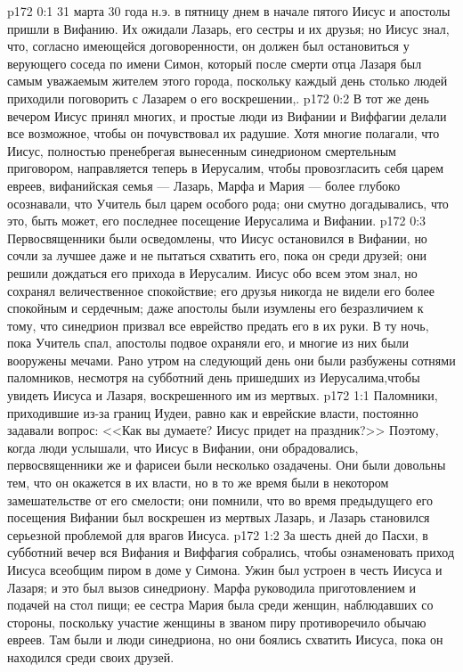 \vs p172 0:1 31 марта 30 года н.э. в пятницу днем в начале пятого Иисус и апостолы пришли в Вифанию. Их ожидали Лазарь, его сестры и их друзья; но Иисус знал, что, согласно имеющейся договоренности, он должен был остановиться у верующего соседа по имени Симон, который после смерти отца Лазаря был самым уважаемым жителем этого города, поскольку каждый день столько людей приходили поговорить с Лазарем о его воскрешении,.
\vs p172 0:2 В тот же день вечером Иисус принял многих, и простые люди из Вифании и Виффагии делали все возможное, чтобы он почувствовал их радушие. Хотя многие полагали, что Иисус, полностью пренебрегая вынесенным синедрионом смертельным приговором, направляется теперь в Иерусалим, чтобы провозгласить себя царем евреев, вифанийская семья --- Лазарь, Марфа и Мария --- более глубоко осознавали, что Учитель был царем особого рода; они смутно догадывались, что это, быть может, его последнее посещение Иерусалима и Вифании.
\vs p172 0:3 Первосвященники были осведомлены, что Иисус остановился в Вифании, но сочли за лучшее даже и не пытаться схватить его, пока он среди друзей; они решили дождаться его прихода в Иерусалим. Иисус обо всем этом знал, но сохранял величественное спокойствие; его друзья никогда не видели его более спокойным и сердечным; даже апостолы были изумлены его безразличием к тому, что синедрион призвал все еврейство предать его в их руки. В ту ночь, пока Учитель спал, апостолы подвое охраняли его, и многие из них были вооружены мечами. Рано утром на следующий день они были разбужены сотнями паломников, несмотря на субботний день пришедших из Иерусалима,чтобы увидеть Иисуса и Лазаря, воскрешенного им из мертвых.
\vs p172 1:1 Паломники, приходившие из\hyp{}за границ Иудеи, равно как и еврейские власти, постоянно задавали вопрос: <<Как вы думаете? Иисус придет на праздник?>> Поэтому, когда люди услышали, что Иисус в Вифании, они обрадовались, первосвященники же и фарисеи были несколько озадачены. Они были довольны тем, что он окажется в их власти, но в то же время были в некотором замешательстве от его смелости; они помнили, что во время предыдущего его посещения Вифании был воскрешен из мертвых Лазарь, и Лазарь становился серьезной проблемой для врагов Иисуса.
\vs p172 1:2 За шесть дней до Пасхи, в субботний вечер вся Вифания и Виффагия собрались, чтобы ознаменовать приход Иисуса всеобщим пиром в доме у Симона. Ужин был устроен в честь Иисуса и Лазаря; и это был вызов синедриону. Марфа руководила приготовлением и подачей на стол пищи; ее сестра Мария была среди женщин, наблюдавших со стороны, поскольку участие женщины в званом пиру противоречило обычаю евреев. Там были и люди синедриона, но они боялись схватить Иисуса, пока он находился среди своих друзей.
